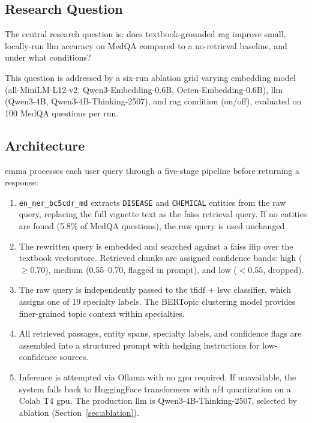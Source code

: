 \subsection{Research Question}

The central research question is: does textbook-grounded \gls{rag} improve small, locally-run \gls{llm} accuracy on MedQA compared to a no-retrieval baseline, and under what conditions?

This question is addressed by a six-run ablation grid varying embedding model (all-MiniLM-L12-v2, Qwen3-Embedding-0.6B, Octen-Embedding-0.6B), \gls{llm} (Qwen3-4B, Qwen3-4B-Thinking-2507), and \gls{rag} condition (on/off), evaluated on 100 MedQA questions per run.

\subsection{Architecture}

\gls{emma} processes each user query through a five-stage pipeline before returning a response:

\begin{enumerate}
    \item \texttt{en\_ner\_bc5cdr\_md} extracts \texttt{DISEASE} and \texttt{CHEMICAL} entities from the raw query, replacing the full vignette text as the \gls{faiss} retrieval query. If no entities are found (5.8\% of MedQA questions), the raw query is used unchanged.

    \item The rewritten query is embedded and searched against a \gls{faiss} \gls{ifip} over the textbook vectorstore. Retrieved chunks are assigned confidence bands: high ($\geq 0.70$), medium (0.55--0.70, flagged in prompt), and low ($< 0.55$, dropped).

    \item The raw query is independently passed to the \gls{tfidf} + \gls{lsvc} classifier, which assigns one of 19 specialty labels. The BERTopic clustering model provides finer-grained topic context within specialties.

    \item All retrieved passages, entity spans, specialty labels, and confidence flags are assembled into a structured prompt with hedging instructions for low-confidence sources.

    \item Inference is attempted via Ollama with no \gls{gpu} required. If unavailable, the system falls back to HuggingFace transformers with \gls{nf4} quantization on a Colab T4 \gls{gpu}. The production \gls{llm} is Qwen3-4B-Thinking-2507, selected by ablation (Section~\ref{sec:ablation}).
\end{enumerate}

